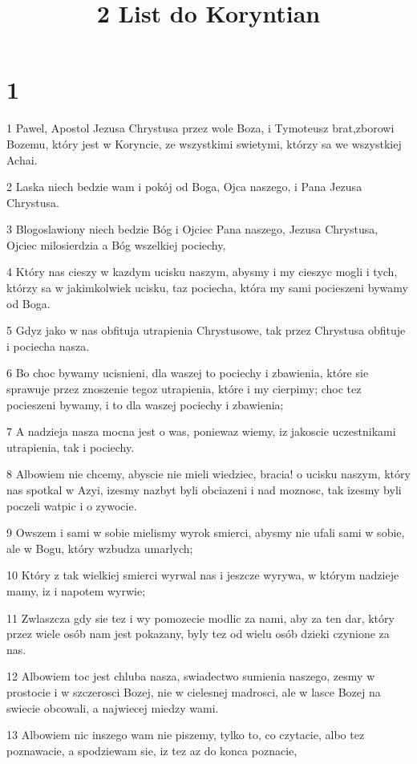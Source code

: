 

\title{2 List do Koryntian}


\chapter{1}

\par 1 Pawel, Apostol Jezusa Chrystusa przez wole Boza, i Tymoteusz brat,zborowi Bozemu, który jest w Koryncie, ze wszystkimi swietymi, którzy sa we wszystkiej Achai.
\par 2 Laska niech bedzie wam i pokój od Boga, Ojca naszego, i Pana Jezusa Chrystusa.
\par 3 Blogoslawiony niech bedzie Bóg i Ojciec Pana naszego, Jezusa Chrystusa, Ojciec milosierdzia a Bóg wszelkiej pociechy,
\par 4 Który nas cieszy w kazdym ucisku naszym, abysmy i my cieszyc mogli i tych, którzy sa w jakimkolwiek ucisku, taz pociecha, która my sami pocieszeni bywamy od Boga.
\par 5 Gdyz jako w nas obfituja utrapienia Chrystusowe, tak przez Chrystusa obfituje i pociecha nasza.
\par 6 Bo choc bywamy ucisnieni, dla waszej to pociechy i zbawienia, które sie sprawuje przez znoszenie tegoz utrapienia, które i my cierpimy; choc tez pocieszeni bywamy, i to dla waszej pociechy i zbawienia;
\par 7 A nadzieja nasza mocna jest o was, poniewaz wiemy, iz jakoscie uczestnikami utrapienia, tak i pociechy.
\par 8 Albowiem nie chcemy, abyscie nie mieli wiedziec, bracia! o ucisku naszym, który nas spotkal w Azyi, izesmy nazbyt byli obciazeni i nad moznosc, tak izesmy byli poczeli watpic i o zywocie.
\par 9 Owszem i sami w sobie mielismy wyrok smierci, abysmy nie ufali sami w sobie, ale w Bogu, który wzbudza umarlych;
\par 10 Który z tak wielkiej smierci wyrwal nas i jeszcze wyrywa, w którym nadzieje mamy, iz i napotem wyrwie;
\par 11 Zwlaszcza gdy sie tez i wy pomozecie modlic za nami, aby za ten dar, który przez wiele osób nam jest pokazany, byly tez od wielu osób dzieki czynione za nas.
\par 12 Albowiem toc jest chluba nasza, swiadectwo sumienia naszego, zesmy w prostocie i w szczerosci Bozej, nie w cielesnej madrosci, ale w lasce Bozej na swiecie obcowali, a najwiecej miedzy wami.
\par 13 Albowiem nic inszego wam nie piszemy, tylko to, co czytacie, albo tez poznawacie, a spodziewam sie, iz tez az do konca poznacie,
